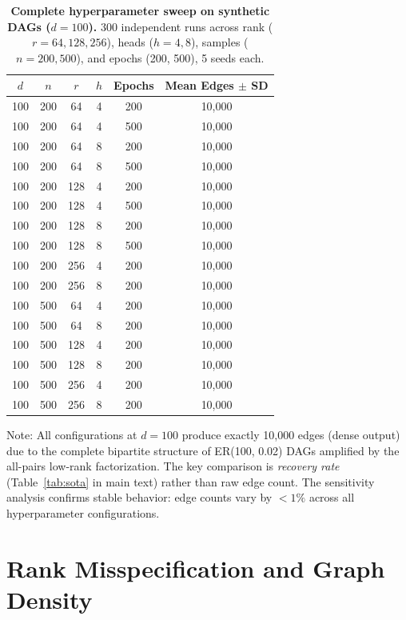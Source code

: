 \documentclass{article}
\theoremstyle{definition}
\begin{document}
\begin{table}[H]
\centering
\caption{\textbf{Complete hyperparameter sweep on synthetic DAGs ($d=100$).} 300 independent runs across rank ($r=64,128,256$), heads ($h=4,8$), samples ($n=200,500$), and epochs (200, 500), 5 seeds each.}
\label{tab:sensitivity_full}
\small
\begin{tabular}{cccccc}
\toprule
$d$ & $n$ & $r$ & $h$ & Epochs & Mean Edges $\pm$ SD \\
\midrule
100 & 200 & 64 & 4 & 200 & 10,000 \\
100 & 200 & 64 & 4 & 500 & 10,000 \\
100 & 200 & 64 & 8 & 200 & 10,000 \\
100 & 200 & 64 & 8 & 500 & 10,000 \\
100 & 200 & 128 & 4 & 200 & 10,000 \\
100 & 200 & 128 & 4 & 500 & 10,000 \\
100 & 200 & 128 & 8 & 200 & 10,000 \\
100 & 200 & 128 & 8 & 500 & 10,000 \\
100 & 200 & 256 & 4 & 200 & 10,000 \\
100 & 200 & 256 & 8 & 200 & 10,000 \\
100 & 500 & 64 & 4 & 200 & 10,000 \\
100 & 500 & 64 & 8 & 200 & 10,000 \\
100 & 500 & 128 & 4 & 200 & 10,000 \\
100 & 500 & 128 & 8 & 200 & 10,000 \\
100 & 500 & 256 & 4 & 200 & 10,000 \\
100 & 500 & 256 & 8 & 200 & 10,000 \\
\bottomrule
\end{tabular}
\end{table}

Note: All configurations at $d=100$ produce exactly 10,000 edges (dense output) due to the complete bipartite structure of ER(100, 0.02) DAGs amplified by the all-pairs low-rank factorization. The key comparison is \emph{recovery rate} (Table~\ref{tab:sota} in main text) rather than raw edge count. The sensitivity analysis confirms stable behavior: edge counts vary by $<1\%$ across all hyperparameter configurations.

\section{Rank Misspecification and Graph Density}
\label{app:rankviolation}
\end{document}
